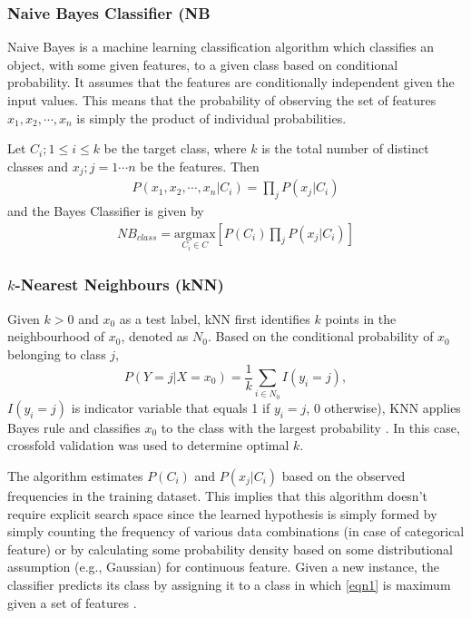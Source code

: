 \subsubsection{Naive Bayes Classifier (NB}

Naive Bayes is a machine learning classification algorithm which classifies an object, with some given features, to a given class based on conditional probability. It assumes that the features are conditionally independent given the input values. This means that the probability of observing the set of features $x_1, x_2, \cdots, x_n$ is simply the product of individual probabilities.

\noindent Let $C_i; 1\leq i \leq k$ be the target class, where $k$ is the total number of distinct classes and $x_j; j=1\cdots n$ be the features. Then 
\begin{align*}
P(x_1, x_2, \cdots, x_n|C_i) = \prod_j{P(x_j|C_i)}
\end{align*}
and the Bayes Classifier is given by
\begin{align}
NB_{class} =  \underset{C_i\in C}{\mathrm{argmax }}\left[ P(C_i) \prod_j{P(x_j|C_i)}\right] \label{eqn1}
\end{align}


\subsubsection{$k$-Nearest Neighbours (kNN)}

Given $k>0$ and $x_0$ as a test label, kNN first identifies $k$ points in the neighbourhood of $x_0$, denoted as $\mathit{N}_0$. Based on the conditional probability of $x_0$ belonging to class $j$, 
\[
P(Y = j|X = x_0) = \frac{1}{k}\sum_{i\in \mathit{N}_0}I(y_i=j),
\]
$I(y_i=j)$ is indicator variable that equals 1 if $y_i=j$, 0 otherwise), KNN applies Bayes rule and classifies $x_0$ to the class with the largest probability \citep{trevor2009elements}. In this case, crossfold validation was used to determine optimal $k$.


\noindent The algorithm estimates $P(C_i)$ and $P(x_j|C_i)$ based on the observed frequencies in the training dataset. This implies that this algorithm doesn't require explicit search space since the learned hypothesis is simply formed by simply counting the frequency of various data combinations (in case of categorical feature) or by calculating some probability density based on some distributional assumption (e.g., Gaussian) for continuous feature. Given a new instance, the classifier predicts its class by assigning it to a class in which \autoref{eqn1} is maximum given a set of features \citep{mitchell1990machine}.


